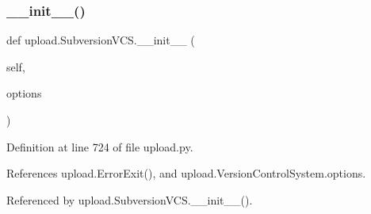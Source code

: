 \subsubsection{\texorpdfstring{\+\_\+\+\_\+init\+\_\+\+\_\+()}{\_\_init\_\_()}\hspace{0.1cm}{\footnotesize\ttfamily [1/2]}}
{\footnotesize\ttfamily def upload.\+Subversion\+V\+C\+S.\+\_\+\+\_\+init\+\_\+\+\_\+ (\begin{DoxyParamCaption}\item[{}]{self,  }\item[{}]{options }\end{DoxyParamCaption})}



Definition at line 724 of file upload.\+py.



References upload.\+Error\+Exit(), and upload.\+Version\+Control\+System.\+options.



Referenced by upload.\+Subversion\+V\+C\+S.\+\_\+\+\_\+init\+\_\+\+\_\+().


